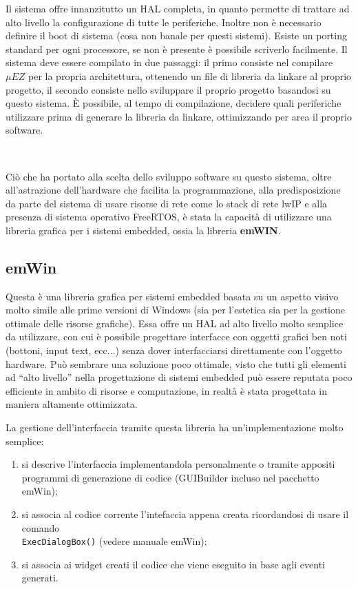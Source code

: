 \documentclass[a4paper,titlepage]{book}
\begin{document}
Il sistema offre innanzitutto un HAL completa, in quanto permette di trattare ad alto livello la configurazione di tutte le periferiche. Inoltre non è necessario definire il boot di sistema (cosa non banale per questi sistemi). Esiste un porting standard per ogni processore, se non è presente è possibile scriverlo facilmente. Il sistema deve essere compilato in due passaggi: il primo consiste nel compilare $\mu EZ$ per la propria architettura, ottenendo un file di libreria da linkare al proprio progetto, il secondo consiste nello sviluppare il proprio progetto basandosi su questo sistema. È possibile, al tempo di compilazione, decidere quali periferiche utilizzare prima di generare la libreria da linkare, ottimizzando per area il proprio software.

~

Ciò che ha portato alla scelta dello sviluppo software su questo sistema, oltre all'astrazione dell'hardware che facilita la programmazione, alla predisposizione da parte del sistema di usare risorse di rete come lo stack di rete lwIP e alla presenza di sistema operativo FreeRTOS, è stata la capacità di utilizzare una libreria grafica per i sistemi embedded, ossia la libreria \textbf{emWIN}.

\subsection{emWin}

Questa è una libreria grafica per sistemi embedded basata su un aspetto visivo molto simile alle prime versioni di Windows (sia per l'estetica sia per la gestione ottimale delle risorse grafiche). Essa offre un HAL ad alto livello molto semplice da utilizzare, con cui è possibile progettare interfacce con oggetti grafici ben noti (bottoni, input text, ecc...) senza dover interfacciarsi direttamente con l'oggetto hardware. Può sembrare una soluzione poco ottimale, visto che tutti gli elementi ad ``alto livello'' nella progettazione di sistemi embedded può essere reputata poco efficiente in ambito di risorse e computazione, in realtà è stata progettata in maniera altamente ottimizzata.

La gestione dell'interfaccia tramite questa libreria ha un'implementazione molto semplice:

\begin{enumerate}[noitemsep,topsep=18pt,parsep=10pt,partopsep=0pt]
\item si descrive l'interfaccia implementandola personalmente o tramite appositi programmi di generazione di codice (GUIBuilder incluso nel pacchetto emWin);
\item si associa al codice corrente l'intefaccia appena creata ricordandosi di usare il comando \\\lstinline!ExecDialogBox()! (vedere manuale emWin);
\item si associa ai widget creati il codice che viene eseguito in base agli eventi generati.

\end{enumerate}
\end{document}
